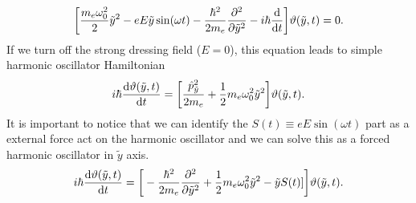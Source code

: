 \begin{equation} \label{eq_a6}
    \bigg[
    \frac{m_e \omega_0^2}{2}\tilde{y}^2
    - {eE\tilde{y}}\sin(\omega t)
    -
    \frac{\hbar^2}{2m_e}
    \pdv[2]{\tilde{y}}
    - i \hbar \dv{t}
    \bigg]
    \vartheta(\tilde{y},t) = 0.
\end{equation}
If we turn off the strong dressing field ($E=0$), this equation leads to simple harmonic oscillator Hamiltonian
\begin{equation} \label{eq_a7}
     i \hbar \dv{\vartheta(\tilde{y},t)}{t} =
    \bigg[
    \frac{\hat{p}_{\tilde{y}}^2}{2m_e} +
    \frac{1}{2}m_e \omega_0^2\tilde{y}^2
    \bigg]
    \vartheta(\tilde{y},t).
\end{equation}
It is important to notice that we can identify the $S(t) \equiv eE\sin(\omega t)$ part as a external force act on the harmonic oscillator and we can solve this as a forced harmonic oscillator in $\tilde{y}$ axis.
\begin{equation} \label{eq_a8}
  \begin{aligned}
    i \hbar \dv{\vartheta(\tilde{y},t)}{t} =
    \bigg[
    -
    \frac{\hbar^2}{2m_e}
    \pdv[2]{\tilde{y}} +
    \frac{1}{2}m_e \omega_0^2\tilde{y}^2
    - \tilde{y}S(t)]
    \bigg]
    \vartheta(\tilde{y},t).
  \end{aligned}
\end{equation}

